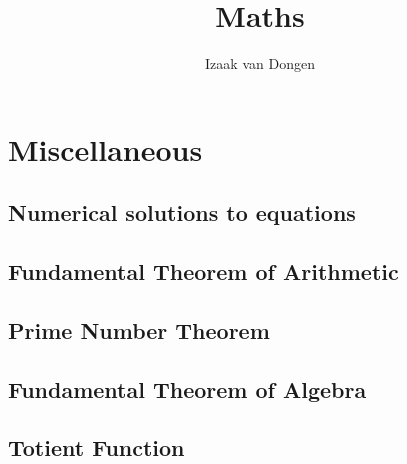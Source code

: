 \documentclass[a4paper,11pt]{article}
\title{Maths}
\author{Izaak van Dongen}
\begin{document}
    \maketitle\thispagestyle{empty} %
    \tableofcontents


    \section{Miscellaneous}

    \subsection{Numerical solutions to equations}

    \subsection{Fundamental Theorem of Arithmetic}

    \subsection{Prime Number Theorem}

    \subsection{Fundamental Theorem of Algebra}

    \subsection{Totient Function} \label{sec:totient}
\end{document}

